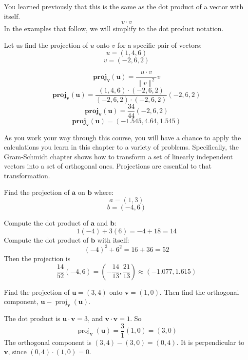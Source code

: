 You learned previously that this is the same as the dot product of a vector with itself.
$${v\cdot v}$$
In the examples that follow, we will simplify to the dot product notation.

\begin{Worked}
\begin{Problem}
Let us find the projection of $u$ onto $v$ for a specific pair of vectors:
$$u = (1,4,6)$$ 
$$v = (-2,6,2)$$ 
\end{Problem}
\begin{Solution}
$$\mathbf{proj}_\mathbf{v}(\mathbf{u}) = \frac{u\cdot v}{\parallel {v}\parallel ^2}v$$
$$\mathbf{proj}_\mathbf{v}(\mathbf{u}) = \frac{(1,4,6)\cdot(-2,6,2)}{ (-2,6,2)\cdot (-2,6,2)}(-2,6,2)$$
$$\mathbf{proj}_\mathbf{v}(\mathbf{u}) = \frac{34}{44}(-2,6,2)$$
$$\mathbf{proj}_\mathbf{v}(\mathbf{u}) = (-1.545, 4.64, 1.545)$$
\end{Solution}
\end{Worked}

As you work your way through this course, you will have a chance to apply the calculations you learn in this chapter to a variety of problems. Specifically, the Gram-Schmidt chapter shows how to transform a set of linearly independent vectors into a set of orthogonal ones. Projections are essential to that transformation. 

\begin{Exercise}[title={Projections}, label=projections]
	Find the projection of $\mathbf{a}$ on $\mathbf{b}$ where:
	$$a = (1,3)$$
	$$b = (-4,6)$$
\end{Exercise}
\begin{Answer}[ref=projections]
	Compute the dot product of $\mathbf{a}$ and $\mathbf{b}$:
	$$1(-4) + 3(6) = -4 + 18 = 14$$
	Compute the dot product of $\mathbf{b}$ with itself:
	$$(-4)^2 + 6^2 = 16 + 36 = 52$$
	Then the projection is
	$$\frac{14}{52}(-4, 6) = \left(-\frac{14}{13}, \frac{21}{13}\right) \approx (-1.077, 1.615)$$
\end{Answer}

\begin{Exercise}[title={Projection onto an axis}, label=projections2]
	Find the projection of $\mathbf{u} = (3, 4)$ onto $\mathbf{v} = (1, 0)$. Then find the orthogonal component, $\mathbf{u} - \operatorname{proj}_{\mathbf{v}}(\mathbf{u})$.
\end{Exercise}
\begin{Answer}[ref=projections2]
	The dot product is $\mathbf{u} \cdot \mathbf{v} = 3$, and $\mathbf{v} \cdot \mathbf{v} = 1$. So
	$$\operatorname{proj}_{\mathbf{v}}(\mathbf{u}) = \frac{3}{1}(1, 0) = (3, 0)$$
	The orthogonal component is $(3, 4) - (3, 0) = (0, 4)$. It is perpendicular to $\mathbf{v}$, since $(0, 4) \cdot (1, 0) = 0$.
\end{Answer}
 
